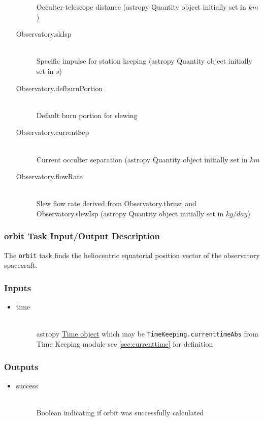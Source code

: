 \documentclass[cleanfoot]{asme2ej}
\begin{document}
\begin{itemize}
\begin{description}
        Occulter-telescope distance (astropy Quantity object initially set in $ km $)
        \item[Observatory.skIsp] \hfill \\
        Specific impulse for station keeping (astropy Quantity object initially set in $ s $)
        \item[Observatory.defburnPortion] \hfill \\
        Default burn portion for slewing
        \item[Observatory.currentSep] \hfill \\
        Current occulter separation (astropy Quantity object initially set in $ km $
        \item[Observatory.flowRate] \hfill \\
        Slew flow rate derived from Observatory.thrust and Observatory.slewIsp (astropy Quantity object initially set in $ kg/day $)
        
    \end{description}
\end{itemize}

\subsubsection{orbit Task Input/Output Description} \label{sec:orbittask}
The \verb+orbit+ task finds the heliocentric equatorial position vector of the observatory spacecraft.

\subsubsection*{Inputs}
\begin{itemize}
    \item
    \begin{description}
        \item[time] \hfill \\
        astropy \href{http://astropy.readthedocs.org/en/latest/time/index.html}{Time object} which may be \verb+TimeKeeping.currenttimeAbs+ from Time Keeping module see \ref{sec:currenttime} for definition
    \end{description}
\end{itemize}

\subsubsection*{Outputs}
\begin{itemize}
    \item
    \begin{description}
        \item[success] \hfill \\
        Boolean indicating if orbit was successfully calculated
    \end{description}
\end{itemize}
\end{document}
